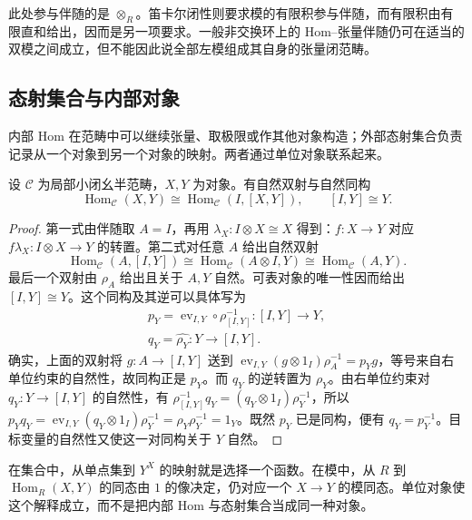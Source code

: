 \ProseParagraphBreak
此处参与伴随的是 \(\otimes_R\)。笛卡尔闭性则要求模的有限积参与伴随，而有限积由有限直和给出，因而是另一项要求。一般非交换环上的 Hom--张量伴随仍可在适当的双模之间成立，但不能因此说全部左模组成其自身的张量闭范畴。

\subsection{态射集合与内部对象}
\label{b4:subsec:closed-external-internal}

内部 Hom 在范畴中可以继续张量、取极限或作其他对象构造；外部态射集合负责记录从一个对象到另一个对象的映射。两者通过单位对象联系起来。

\begin{proposition}\label{b4:prop:closed-unit-hom}
	设 \(\mathcal C\) 为局部小闭幺半范畴，\(X,Y\) 为对象。有自然双射与自然同构
	\[
		\operatorname{Hom}_{\mathcal C}(X,Y) \cong\operatorname{Hom}_{\mathcal C}(I,[X,Y]), \qquad [I,Y]\cong Y.
	\]
\end{proposition}
\begin{proof}
	第一式由伴随取 \(A=I\)，再用 \(\lambda_X:I\otimes X\cong X\) 得到：\(f:X\to Y\) 对应 \(f\lambda_X:I\otimes X\to Y\) 的转置。第二式对任意 \(A\) 给出自然双射
	\[
		\operatorname{Hom}_{\mathcal C}(A,[I,Y]) \cong\operatorname{Hom}_{\mathcal C}(A\otimes I,Y) \cong\operatorname{Hom}_{\mathcal C}(A,Y).
	\]
	最后一个双射由 \(\rho_A\) 给出且关于 \(A,Y\) 自然。可表对象的唯一性因而给出 \([I,Y]\cong Y\)。这个同构及其逆可以具体写为
	\[
		\begin{gathered}
			p_Y=\operatorname{ev}_{I,Y}\circ\rho_{[I,Y]}^{-1}:[I,Y]\longrightarrow Y,\\
			q_Y=\widehat{\rho_Y}:Y\longrightarrow[I,Y].
		\end{gathered}
	\]
	确实，上面的双射将 \(g:A\to[I,Y]\) 送到 \(\operatorname{ev}_{I,Y}(g\otimes1_I)\rho_A^{-1}=p_Yg\)，等号来自右单位约束的自然性，故同构正是 \(p_Y\)。而 \(q_Y\) 的逆转置为 \(\rho_Y\)。由右单位约束对 \(q_Y:Y\to[I,Y]\) 的自然性，有 \(\rho_{[I,Y]}^{-1}q_Y=(q_Y\otimes1_I)\rho_Y^{-1}\)，所以 \(p_Yq_Y=\operatorname{ev}_{I,Y}(q_Y\otimes1_I)\rho_Y^{-1}=\rho_Y\rho_Y^{-1}=1_Y\)。既然 \(p_Y\) 已是同构，便有 \(q_Y=p_Y^{-1}\)。目标变量的自然性又使这一对同构关于 \(Y\) 自然。
\end{proof}

在集合中，从单点集到 \(Y^X\) 的映射就是选择一个函数。在模中，从 \(R\) 到 \(\operatorname{Hom}_R(X,Y)\) 的同态由 \(1\) 的像决定，仍对应一个 \(X\to Y\) 的模同态。单位对象使这个解释成立，而不是把内部 Hom 与态射集合当成同一种对象。

